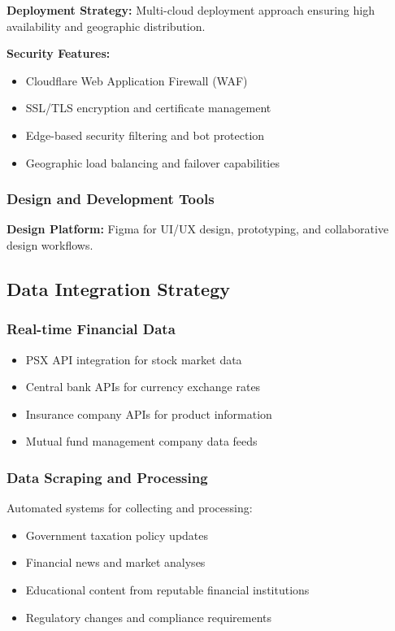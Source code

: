 \documentclass[12pt]{article}
\begin{document}
\textbf{Deployment Strategy:} Multi-cloud deployment approach ensuring high availability and geographic distribution.

\textbf{Security Features:}
\begin{itemize}
    \item Cloudflare Web Application Firewall (WAF)
    \item SSL/TLS encryption and certificate management
    \item Edge-based security filtering and bot protection
    \item Geographic load balancing and failover capabilities
\end{itemize}

\subsubsection{Design and Development Tools}
\textbf{Design Platform:} Figma for UI/UX design, prototyping, and collaborative design workflows.

\subsection{Data Integration Strategy}

\subsubsection{Real-time Financial Data}
\begin{itemize}
    \item PSX API integration for stock market data
    \item Central bank APIs for currency exchange rates
    \item Insurance company APIs for product information
    \item Mutual fund management company data feeds
\end{itemize}

\subsubsection{Data Scraping and Processing}
Automated systems for collecting and processing:
\begin{itemize}
    \item Government taxation policy updates
    \item Financial news and market analyses
    \item Educational content from reputable financial institutions
    \item Regulatory changes and compliance requirements
\end{itemize}
\end{document}
